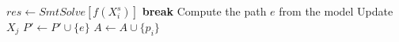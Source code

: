 	\STATE $res \gets SmtSolve\left[
	 f(X_i^s) 
	\right]$
		\STATE \textbf{break}
	\ENDIF
	\STATE Compute the path $e$ from the model
	\STATE Update $X_j$
	\STATE $P' \gets P' \cup \{e\}$
	\STATE $A \gets A \cup \{p_i\}$
\ENDWHILE

